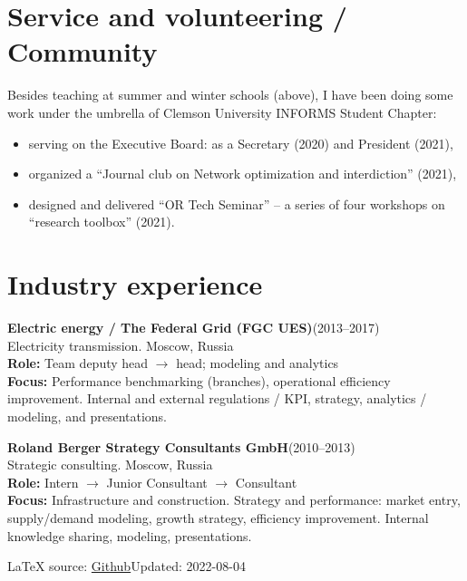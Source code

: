 \documentclass[11pt, a4paper]{article} \usepackage{geometry} %
\newcommand{\jobl}[5]{%
  \textbf{#1}\hfill (#2)\\
  #3\vspace{0.25em}\\
  \textbf{Role:} #4\\
  \textbf{Focus:} #5}
\newcommand{\job}[5]{%
  \jobl{#1}{#2}{#3}{#4}{#5}\vspace{0.5em}
}
\begin{document}
   \section*{Service and volunteering / Community}
   Besides teaching at summer and winter schools (above), I have been doing some work under the umbrella of Clemson University INFORMS Student Chapter:
   \begin{itemize}
     \itemsep0pt
   \item serving on the Executive Board: as a Secretary (2020) and President
     (2021),
   \item organized a ``Journal club on Network optimization and interdiction''
     (2021),
   \item designed and delivered ``OR Tech Seminar'' -- a series of four
     workshops on ``research toolbox'' (2021).
   \end{itemize}
   \vspace{0.3em}

   \section*{Industry experience}
   \job{Electric energy / The Federal Grid (FGC UES)}{2013--2017}{Electricity transmission.
     Moscow, Russia}{Team deputy head $\rightarrow$ head; modeling and analytics}{Performance
     benchmarking (branches), operational efficiency improvement. Internal
     and external regulations / KPI, strategy, analytics / modeling, and presentations.}

   \noindent
   \job{Roland Berger Strategy Consultants GmbH}{2010--2013}{Strategic consulting.
     Moscow, Russia}{ Intern $\rightarrow$ Junior
     Consultant $\rightarrow$ Consultant}{Infrastructure and construction.
     Strategy and performance: market entry, supply/demand modeling, growth
     strategy, efficiency improvement. Internal knowledge sharing, modeling, presentations.}
   {%
   \vfill\noindent\tiny\LaTeX{} source: \href{https://github.com/alex-bochkarev/AB-CV}{Github}\hfill  Updated: 2022-08-04}
\end{document}
